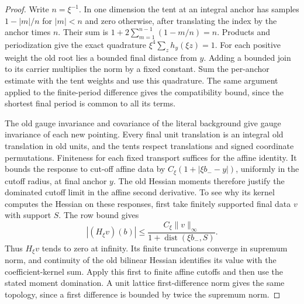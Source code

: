\documentclass[11pt,letterpaper,reqno]{amsart}
\numberwithin{equation}{section}
\theoremstyle{definition}
\theoremstyle{remark}
\begin{document}
\begin{proof}
Write \(n=\xi^{-1}\). In one dimension the tent at an integral
anchor has samples \(1-|m|/n\) for \(|m|<n\) and zero otherwise,
after translating the index by the anchor times \(n\). Their sum
is \(1+2\sum_{m=1}^{n-1}(1-m/n)=n\). Products and periodization
give the exact quadrature \(\xi^4\sum_z h_y(\xi z)=1\). For
each positive weight the old root lies a bounded final distance
from \(y\). Adding a bounded join to its carrier multiplies the
norm by a fixed constant. Sum the per-anchor estimate with the
tent weights and use this quadrature. The same argument applied
to the finite-period difference gives the compatibility bound,
since the shortest final period is common to all its terms.

The old gauge invariance and covariance of the literal background
give gauge invariance of each new pointing. Every final unit
translation is an integral old translation in old units, and the
tents respect translations and signed coordinate permutations.
Finiteness for each
fixed transport suffices for the affine identity. It bounds the
response to cut-off affine data by $C_\xi(1+|\xi b_--y|)$,
uniformly in the cutoff radius, at final anchor $y$. The old
Hessian moments therefore justify the dominated cutoff limit in
the affine second derivative. To see why its kernel computes the
Hessian on these responses, first take finitely supported final
data $v$ with support $S$. The row bound gives
\[
 |(H_\xi v)(b)|\le
 \frac{C_\xi\|v\|_\infty}{1+\operatorname{dist}(\xi b_-,S)}.
\]
Thus $H_\xi v$ tends to zero at infinity. Its finite truncations
converge in supremum norm, and continuity of the old bilinear
Hessian identifies its value with the coefficient-kernel sum.
Apply this first to finite affine cutoffs and then use the stated
moment domination. A unit lattice first-difference norm gives the
same topology, since a first difference is bounded by twice the
supremum norm.


\end{proof}
\end{document}
